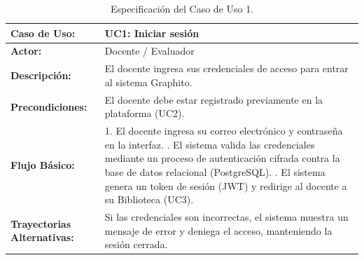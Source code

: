\begin{table}[H]
	\centering
	\begin{tabular}{|p{3cm}|p{11cm}|}
		\hline
		\rowcolor[HTML]{E7F3FF}
		\textbf{Caso de Uso:}               & \textbf{UC1: Iniciar sesión}                                                                                                    \\ \hline
		\textbf{Actor:}                     & Docente / Evaluador                                                                                                             \\ \hline
		\textbf{Descripción:}               & El docente ingresa sus credenciales de acceso para entrar al sistema Graphito.                                                  \\ \hline
		\textbf{Precondiciones:}            & El docente debe estar registrado previamente en la plataforma (UC2).                                                            \\ \hline
		\textbf{Flujo Básico:}              &
		1. El docente ingresa su correo electrónico y contraseña en la interfaz. \newline
		2. El sistema valida las credenciales mediante un proceso de autenticación cifrada contra la base de datos relacional (PostgreSQL). \newline
		3. El sistema genera un token de sesión (JWT) y redirige al docente a su Biblioteca (UC3).                                                                            \\ \hline
		\textbf{Trayectorias Alternativas:} & Si las credenciales son incorrectas, el sistema muestra un mensaje de error y deniega el acceso, manteniendo la sesión cerrada. \\ \hline
	\end{tabular}
	\caption{Especificación del Caso de Uso 1.}
\end{table}


